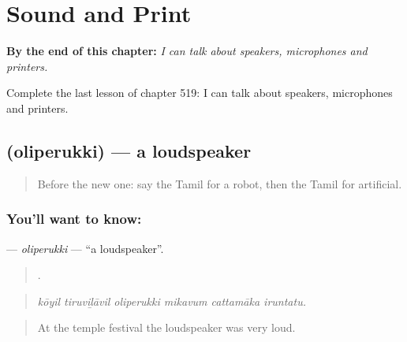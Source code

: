 
\chapter{Sound and Print}
\label{ch:ta-sound-and-print}

\begin{chapteropening}
\textbf{By the end of this chapter:} \emph{I can talk about speakers, microphones and printers.}

Complete the last lesson of chapter 519: I can talk about speakers, microphones and printers.
\end{chapteropening}

\section[\texorpdfstring{\ta{ஒலிபெருக்கி} (oliperukki)}{ஒலிபெருக்கி (oliperukki)}]{ (oliperukki) — a loudspeaker}

\label{lesson:TA-C519-oliperukki}



\begin{quote}
Before the new one: say the Tamil for a robot, then the Tamil for artificial.
\end{quote}

\subsection*{You'll want to know: }
\textbf{} — \emph{oliperukki} — \textquotedblleft{}a loudspeaker\textquotedblright{}.

\begin{quote}
     .
\end{quote}

\begin{quote}
\emph{kōyil tiruviḻāvil oliperukki mikavum cattamāka iruntatu.}
\end{quote}

\begin{quote}
At the temple festival the loudspeaker was very loud.
\end{quote}

